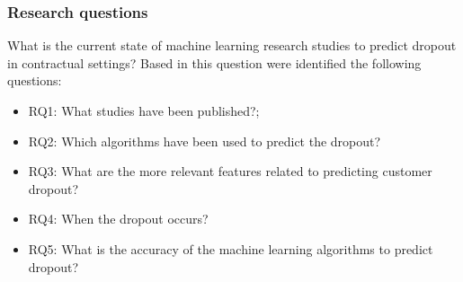 \documentclass[10pt]{beamer}
\begin{document}
\begin{frame}
	\frametitle{Research questions}
	What is the current state of machine learning research studies to predict dropout in contractual settings? Based in this question were identified the following questions:
	\begin{itemize}
		\item RQ1: What studies have been published?;
		\item RQ2: Which algorithms have been used to predict the dropout?
		\item RQ3: What are the more relevant features related to predicting customer dropout?
		\item RQ4: When the dropout occurs? 
		\item RQ5: What is the accuracy of the machine learning algorithms to predict dropout?
	\end{itemize}
\end{frame}

\end{document}
